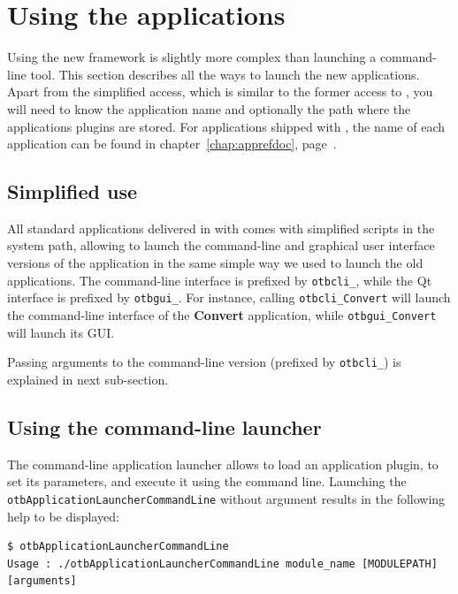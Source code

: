 \section{Using the applications}\label{sec:usingapps}

Using the new \app framework is slightly more complex than launching a
command-line tool. This section describes all the ways to launch the
new applications. Apart from the simplified access, which is similar
to the former access to \app, you will need to know the application
name and optionally the path where the applications plugins are stored.
For applications shipped with \otb, the name of each
application can be found in chapter~\ref{chap:apprefdoc},
page~\pageref{chap:apprefdoc}.

\subsection{Simplified use}

All standard applications delivered in with \otb comes with simplified
scripts in the system path, allowing to launch the command-line and
 graphical user interface versions of the application in the same simple way
 we used to launch the old applications. The command-line interface is prefixed by
\verb?otbcli_?, while the Qt interface is prefixed by
\verb?otbgui_?. For instance, calling \verb?otbcli_Convert? will
launch the command-line interface of the \textbf{Convert} application,
while \verb?otbgui_Convert? will launch its GUI.


Passing arguments to the command-line version (prefixed by
\verb?otbcli_?) is explained in next sub-section.

\subsection{Using the command-line launcher}

The command-line application launcher allows to load an application
plugin, to set its parameters, and execute it using the command
line. Launching the \verb?otbApplicationLauncherCommandLine?
without argument results in the following help to be displayed:

\begin{verbatim}
$ otbApplicationLauncherCommandLine
Usage : ./otbApplicationLauncherCommandLine module_name [MODULEPATH] [arguments]
\end{verbatim}

